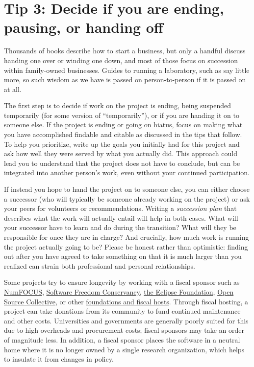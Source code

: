 \documentclass[10pt,letterpaper]{article}
\begin{document}
\section*{Tip 3: Decide if you are ending, pausing, or handing off}

Thousands of books describe how to start a business,
but only a handful discuss handing one over or winding one down,
and most of those focus on succession within family-owned businesses.
Guides to running a laboratory, such as \cite{Barker2010,Cohen2018} say little more,
so such wisdom as we have is passed on person-to-person if it is passed on at all.

The first step is to decide if work on the project is ending,
being suspended temporarily (for some version of ``temporarily''),
or if you are handing it on to someone else.
If the project is ending or going on hiatus,
focus on making what you have accomplished findable and citable
as discussed in the tips that follow.
To help you prioritize,
write up the goals you initially had for this project
and ask how well they were served by what you actually did. This approach could lead you to understand that the project does not have to conclude, but can be integrated into another person's work, even without your continued participation.

If instead you hope to hand the project on to someone else,
you can either choose a successor
(who will typically be someone already working on the project)
or ask your peers for volunteers or recommendations.
Writing a \emph{succession plan} that describes what the work will actually entail
will help in both cases.
What will your successor have to learn and do during the transition?
What will they be responsible for once they are in charge?
And crucially,
how much work is running the project actually going to be?
Please be honest rather than optimistic:
finding out after you have agreed to take something on
that it is much larger than you realized
can strain both professional and personal relationships.

Some projects try to ensure longevity by working with a fiscal sponsor such as
\href{https://numfocus.org/}{NumFOCUS},
\href{https://sfconservancy.org/}{Software Freedom Conservancy},
\href{https://www.eclipse.org/}{the Eclipse Foundation},
\href{https://oscollective.org/}{Open Source Collective},
or other \href{https://sustainoss.org/academic-map/organizations/index.html}{foundations and fiscal hosts}.
Through fiscal hosting,
a project can take donations from its community to fund continued maintenance and other costs.
Universities and governments are generally poorly suited for this due to high overheads and procurement costs;
fiscal sponsors may take an order of magnitude less.
In addition,
a fiscal sponsor places the software in a neutral home
where it is no longer owned by a single research organization,
which helps to insulate it from changes in policy.
\end{document}
